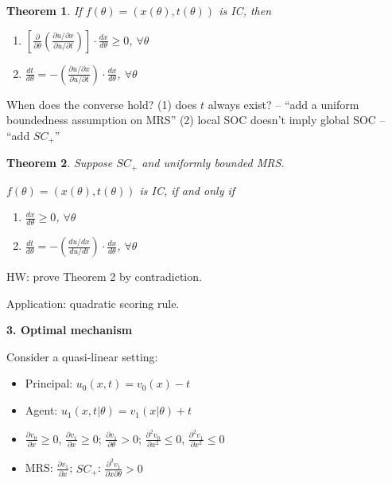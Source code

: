 \documentclass[11pt,leqno]{article}
\newtheorem{theorem}{Theorem}
\begin{document}
\begin{theorem}
If $f(\theta)=\left(x(\theta),t(\theta)\right)$ is IC, then 
\begin{enumerate}
    \item $\left[\frac{\partial}{\partial \theta}(\frac{\partial u/\partial x}{\partial u/\partial t})\right]\cdot \frac{d x}{d \theta}\geq 0$, $\forall \theta$\\
    \item $\frac{d t}{d \theta}=-\left(\frac{\partial u/\partial x}{\partial u/\partial t}\right)\cdot\frac{d x}{d \theta}$, $\forall \theta$
\end{enumerate}
\end{theorem}

When does the converse hold? (1) does $t$ always exist? -- ``add a uniform boundedness assumption on MRS'' (2) local SOC doesn't imply global SOC -- ``add $SC_{+}$''

\begin{theorem}
Suppose $SC_{+}$ and uniformly bounded MRS.

$f(\theta)=\left(x(\theta),t(\theta)\right)$ is IC, if and only if 
\begin{enumerate}
    \item $\frac{d x}{d \theta}\geq 0$, $\forall \theta$\\
    \item $\frac{d t}{d \theta}=-\left(\frac{d u/d x}{d u/d t}\right)\cdot\frac{d x}{d \theta}$, $\forall \theta$
\end{enumerate}
\end{theorem}

HW: prove Theorem 2 by contradiction.

Application: quadratic scoring rule.

\textbf{3. Optimal mechanism}

Consider a quasi-linear setting:
\begin{itemize}
\item Principal: $u_{0}(x,t)=v_{0}(x)-t$
\item Agent: $u_{1}(x,t|\theta)=v_{1}(x|\theta)+t$
\item $\frac{\partial v_{0}}{\partial x}\geq 0$, $\frac{\partial v_{1}}{\partial x}\geq 0$; $\frac{\partial v_{1}}{\partial \theta}>0$; $\frac{\partial^{2} v_{0}}{\partial x^{2}}\leq 0$, $\frac{\partial^{2} v_{1}}{\partial x^{2}}\leq 0$
\item MRS: $\frac{\partial v_{1}}{\partial x}$; $SC_{+}$: $\frac{\partial^{2} v_{1}}{\partial x \partial \theta}>0$
\end{itemize}
\end{document}
